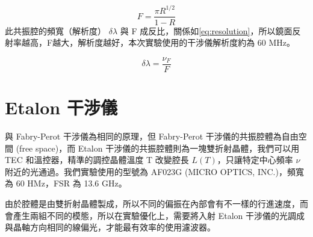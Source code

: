\documentclass[class=NCU_thesis, crop=false]{standalone}
\begin{document}
\begin{equation}
    F=\frac{\pi R^{1/2}}{1-R}
    \label{eq:finesse_definition}
\end{equation}
此共振腔的頻寬（解析度） $\delta \lambda$ 與 F 成反比，關係如\cref{eq:resolution}，所以鏡面反射率越高，F越大，解析度越好，本次實驗使用的干涉儀解析度約為 60 MHz。

\begin{equation}
    \delta \lambda=\frac{\nu_{F}}{F}
    \label{eq:resolution}
\end{equation}


\section{Etalon 干涉儀}
與 Fabry-Perot 干涉儀為相同的原理，但 Fabry-Perot 干涉儀的共振腔體為自由空間 (free space)，而 Etalon 干涉儀的共振腔體則為一塊雙折射晶體，我們可以用 TEC 和溫控器，精準的調控晶體溫度 T 改變腔長 $L(T)$，只讓特定中心頻率 $\nu$ 附近的光通過。我們實驗使用的型號為 AF023G (MICRO OPTICS, INC.)，頻寬為 60 HMz，FSR 為 13.6 GHz。

由於腔體是由雙折射晶體製成，所以不同的偏振在內部會有不一樣的行進速度，而會產生兩組不同的模態，所以在實驗優化上，需要將入射 Etalon 干涉儀的光調成與晶軸方向相同的線偏光，才能最有效率的使用濾波器。
\end{document}
